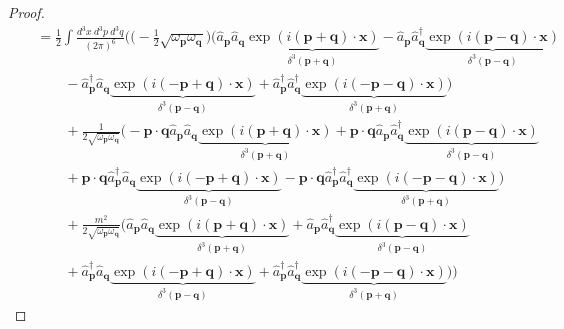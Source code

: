 \begin{proof}
\begin{equation*}
\begin{aligned}
            \phantom{\hat H} & = \frac{1}{2} \int \frac{d^3 x ~ d^3 p ~d^3 q}{(2\pi)^6} \Big (\Big (- \frac{1}{2} \sqrt{\omega_{\mathbf p} \omega_{\mathbf q}} \Big ) \Big (\hat a_{\mathbf p} \hat a_{\mathbf q} \underbrace{\exp(i (\mathbf p + \mathbf q) \cdot \mathbf x)}_{\delta^3 (\mathbf p + \mathbf q)} - \hat a_{\mathbf p} \hat a_{\mathbf q}^\dagger \underbrace{\exp(i (\mathbf p - \mathbf q) \cdot \mathbf x)}_{\delta^3 (\mathbf p - \mathbf q)} \\ & \qquad - \hat a_{\mathbf p}^\dagger \hat a_{\mathbf q} \underbrace{\exp(i (- \mathbf p + \mathbf q) \cdot \mathbf x)}_{\delta^3 (\mathbf p - \mathbf q)} + \hat a_{\mathbf p}^\dagger \hat a_{\mathbf q}^\dagger \underbrace{\exp(i (- \mathbf p - \mathbf q) \cdot \mathbf x)}_{\delta^3 (\mathbf p + \mathbf q)} \Big) \\ & \qquad + \frac{1}{2 \sqrt{\omega_{\mathbf p} \omega_{\mathbf q}}} \Big (- \mathbf p \cdot \mathbf q \hat a_{\mathbf p} \hat a_{\mathbf q} \underbrace{\exp(i (\mathbf p + \mathbf q) \cdot \mathbf x)}_{\delta^3 (\mathbf p + \mathbf q)} + \mathbf p \cdot \mathbf q \hat a_{\mathbf p} \hat a_{\mathbf q}^\dagger \underbrace{\exp(i (\mathbf p - \mathbf q) \cdot \mathbf x)}_{\delta^3 (\mathbf p - \mathbf q)} \\ & \qquad + \mathbf p \cdot \mathbf q \hat a_{\mathbf p}^\dagger \hat a_{\mathbf q} \underbrace{\exp(i (- \mathbf p + \mathbf q) \cdot \mathbf x)}_{\delta^3 (\mathbf p - \mathbf q)} - \mathbf p \cdot \mathbf q \hat a_{\mathbf p}^\dagger \hat a_{\mathbf q}^\dagger \underbrace{\exp(i (- \mathbf p - \mathbf q) \cdot \mathbf x)}_{\delta^3 (\mathbf p + \mathbf q)} \Big) \\ & \qquad + \frac{m^2}{2 \sqrt{\omega_{\mathbf p} \omega_{\mathbf q}}} \Big (\hat a_{\mathbf p} \hat a_{\mathbf q} \underbrace{\exp(i (\mathbf p + \mathbf q) \cdot \mathbf x)}_{\delta^3 (\mathbf p + \mathbf q)} + \hat a_{\mathbf p} \hat a_{\mathbf q}^\dagger \underbrace{\exp(i (\mathbf p - \mathbf q) \cdot \mathbf x)}_{\delta^3 (\mathbf p - \mathbf q)} \\ & \qquad + \hat a_{\mathbf p}^\dagger \hat a_{\mathbf q} \underbrace{\exp(i (- \mathbf p + \mathbf q) \cdot \mathbf x)}_{\delta^3 (\mathbf p - \mathbf q)} + \hat a_{\mathbf p}^\dagger \hat a_{\mathbf q}^\dagger \underbrace{\exp(i (- \mathbf p - \mathbf q) \cdot \mathbf x)}_{\delta^3 (\mathbf p + \mathbf q)} \Big) \Big) 
        \end{aligned}
        \end{equation*}
        \begin{equation*}

\end{equation*}
\end{proof}
